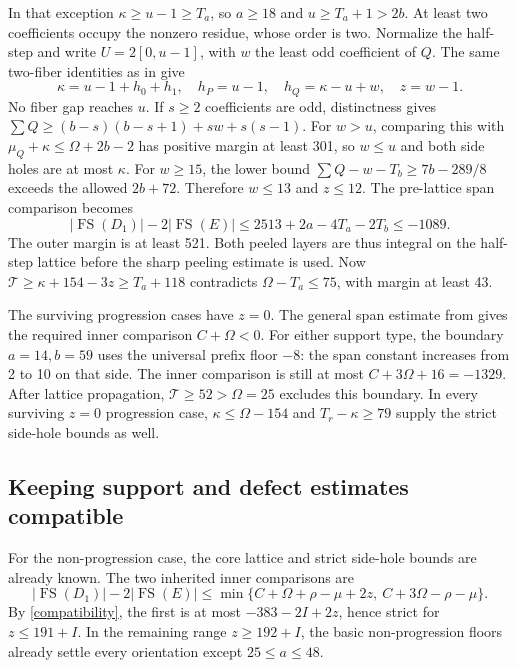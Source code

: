 \documentclass[11pt,a4paper]{article}
\newcommand{\FS}{\operatorname{FS}}
\newcommand{\T}{\mathcal T}
\begin{document}
In that exception $\kappa\ge u-1\ge T_a$, so $a\ge18$ and
$u\ge T_a+1>2b$. At least two coefficients occupy the nonzero
residue, whose order is two. Normalize the half-step and write
$U=2[0,u-1]$, with $w$ the least odd coefficient of $Q$.
The same two-fiber identities as in \cite{previous} give
\[
 \kappa=u-1+h_0+h_1,\quad h_P=u-1,\quad
 h_Q=\kappa-u+w,\quad z=w-1.
\]
No fiber gap reaches $u$. If $s\ge2$ coefficients are odd, distinctness
gives $\sum Q\ge(b-s)(b-s+1)+sw+s(s-1)$.
For $w>u$, comparing this with
$\mu_Q+\kappa\le\Omega+2b-2$ has positive margin at least 301,
so $w\le u$ and both side holes are at most $\kappa$.
For $w\ge15$, the lower bound
$\sum Q-w-T_b\ge7b-289/8$ exceeds the allowed $2b+72$.
Therefore $w\le13$ and $z\le12$.
The pre-lattice span comparison becomes
\[
 |\FS(D_1)|-2|\FS(E)|
 \le2513+2a-4T_a-2T_b\le-1089.
\]
The outer margin is at least 521. Both peeled layers are thus integral
on the half-step lattice before the sharp peeling estimate is used.
Now $\T\ge\kappa+154-3z\ge T_a+118$ contradicts
$\Omega-T_a\le75$, with margin at least 43.

The surviving progression cases have $z=0$. The general span estimate
from \cite{previous} gives the required inner comparison $C+\Omega<0$.
For either support type, the boundary $a=14,b=59$ uses the universal
prefix floor $-8$: the span constant increases from 2 to 10 on that side. The inner comparison is still at most
$C+3\Omega+16=-1329$. After lattice propagation,
$\T\ge52>\Omega=25$ excludes this boundary.
In every surviving $z=0$ progression case,
$\kappa\le\Omega-154$ and $T_r-\kappa\ge79$ supply the strict
side-hole bounds as well.

\subsection{Keeping support and defect estimates compatible}
For the non-progression case, the core lattice and strict side-hole
bounds are already known. The two inherited inner comparisons are
\begin{equation}\label{inner}
 |\FS(D_1)|-2|\FS(E)|\le
 \min\{C+\Omega+\rho-\mu+2z,\ C+3\Omega-\rho-\mu\}.
\end{equation}
By \eqref{compatibility}, the first is at most $-383-2I+2z$, hence
strict for $z\le191+I$. In the remaining range $z\ge192+I$, the
basic non-progression floors already settle every orientation except
$25\le a\le48$.
\end{document}
